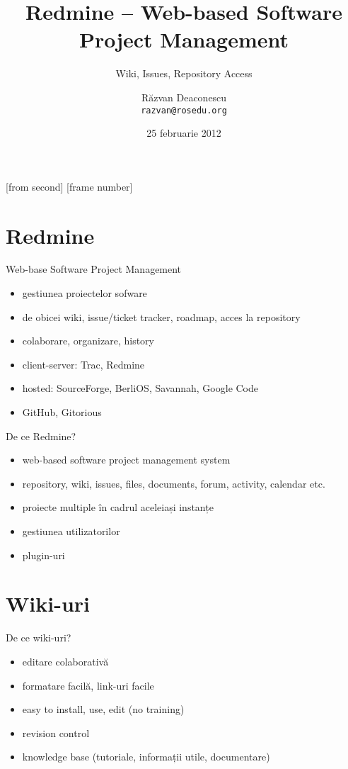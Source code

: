 \documentclass{beamer}
\title[Redmine]{Redmine -- Web-based Software Project Management}
\subtitle{Wiki, Issues, Repository Access}
\institute[ROSEdu]{ROSEdu}
\date{25 februarie 2012}
\author{Răzvan Deaconescu \\ \texttt{razvan@rosedu.org}}
\begin{document}
[from second]
[frame number]

\frame{\titlepage}

\frame{\tableofcontents}

\section{Redmine}

\begin{frame}{Web-base Software Project Management}
  \begin{itemize}
    \item gestiunea proiectelor sofware
    \item de obicei wiki, issue/ticket tracker, roadmap, acces la repository
    \item colaborare, organizare, history
    \item client-server: Trac, Redmine
    \item hosted: SourceForge, BerliOS, Savannah, Google Code
    \item GitHub, Gitorious
  \end{itemize}
\end{frame}

\begin{frame}{De ce Redmine?}
  \begin{itemize}
    \item web-based software project management system
    \item repository, wiki, issues, files, documents, forum, activity,
calendar etc.
    \item proiecte multiple în cadrul aceleiași instanțe
    \item gestiunea utilizatorilor
    \item plugin-uri
  \end{itemize}
\end{frame}

\section{Wiki-uri}

\begin{frame}{De ce wiki-uri?}
  \begin{itemize}
    \item editare colaborativă
    \item formatare facilă, link-uri facile
    \item easy to install, use, edit (no training)
    \item revision control
    \item knowledge base (tutoriale, informații utile, documentare)
  \end{itemize}
\end{frame}
\end{document}
